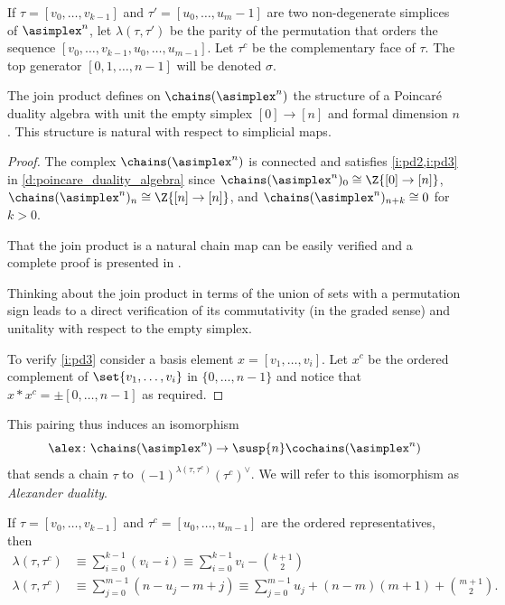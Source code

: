 \begin{notation}
	If $\tau = [v_0,\dots,v_{k-1}]$ and $\tau'=[u_0,\dots,u_{m}-1]$ are two non-degenerate simplices of $\asimplex^n$, let $\lambda(\tau,\tau')$ be the parity of the permutation that orders the sequence $[v_0,\dots,v_{k-1},u_0,\dots,u_{m-1}]$. Let $\tau^c$ be the complementary face of $\tau$. The top generator $[0,1,\dots,n-1]$ will be denoted $\sigma$.
\end{notation}

\begin{theorem}
	The join product defines on $\chains(\asimplex^{n})$ the structure of a Poincar\'e duality algebra with unit the empty simplex $[0] \to [n]$ and formal dimension $n$. This structure is natural with respect to simplicial maps.
\end{theorem}

\begin{proof}
	The complex $\chains(\asimplex^{n})$ is connected and satisfies \cref{i:pd2,i:pd3} in \cref{d:poincare_duality_algebra} since $\chains(\asimplex^{n})_0 \cong \Z\{[0] \to [n]\}$, $\chains(\asimplex^{n})_{n} \cong \Z\{[n] \to [n]\}$, and $\chains(\asimplex^{n})_{n+k} \cong 0$ for $k>0$.

	That the join product is a natural chain map can be easily verified and a complete proof is presented in \cite[p.19]{medina2020prop1}.

	Thinking about the join product in terms of the union of sets with a permutation sign leads to a direct verification of its commutativity (in the graded sense) and unitality with respect to the empty simplex.

	To verify \cref{i:pd3} consider a basis element $x = [v_1,\dots,v_i]$.
	Let $x^c$ be the ordered complement of $\set{v_1,\dots,v_i}$ in $\{0,\dots,n-1\}$ and notice that $x \ast x^c = \pm [0,\dots,n-1]$ as required.
\end{proof}

This pairing thus induces an isomorphism
\begin{equation}\label{eq:iso1}
	\alex \colon \chains(\asimplex^n) \to \susp{n}\cochains(\asimplex^n)
\end{equation}
that sends a chain $\tau$ to $(-1)^{\lambda(\tau,\tau^c)}(\tau^c)^\vee$. We will refer to this isomorphism as \emph{Alexander duality}.

\begin{remark}\label{remark:alex}
	If $\tau = [v_0,\dots,v_{k-1}]$ and $\tau^c = [u_0,\dots,u_{m-1}]$ are the ordered representatives, then
	\begin{align*}
		\lambda(\tau,\tau^c)&\equiv \sum_{i=0}^{k-1} (v_i-i) \equiv \sum_{i=0}^{k-1} v_i - \binom{k+1}{2} \\
		\lambda(\tau,\tau^c)&\equiv \sum_{j=0}^{m-1} (n-u_j-m+j) \equiv \sum_{j=0}^{m-1} u_j +(n-m)(m+1)+\binom{m+1}{2}.
	\end{align*}
\end{remark}

